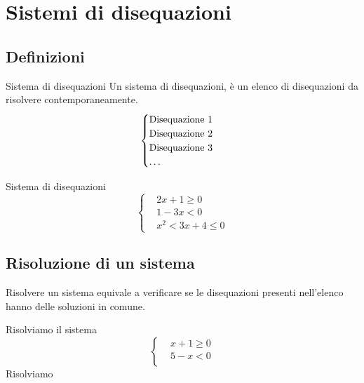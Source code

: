 \chapter{Sistemi di disequazioni}
\section{Definizioni}
\begin{definizionet}{Sistema di disequazioni}{}
	Un sistema di disequazioni, è un elenco di disequazioni da risolvere contemporaneamente.\[\begin{cases}
	\text{Disequazione 1}\\
		\text{Disequazione 2}\\
			\text{Disequazione 3}\\
				\text{\dots}\\
	\end{cases} \]
\end{definizionet}
\begin{esempiot}{Sistema di disequazioni}{}
\[\begin{cases}
&2x+1\geq 0\\
&1-3x<0\\
&x^2<3x+4\leq 0
\end{cases}\]
\end{esempiot}
\section{Risoluzione di un sistema}
Risolvere un sistema equivale a verificare se le disequazioni presenti nell'elenco hanno delle soluzioni in comune. 
\begin{esempiot}{}{}
	Risolviamo il sistema 
	\[\begin{cases}
	&x+1\geq 0\\
	&5-x<0\\
	\end{cases}\]
	Risolviamo 
\end{esempiot}
